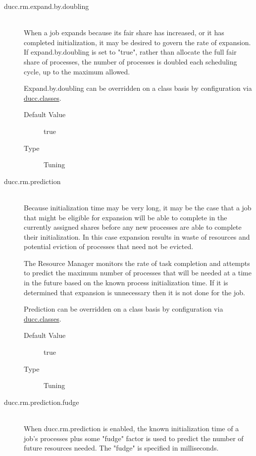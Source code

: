 \begin{description}
        \item[ducc.rm.expand.by.doubling] \hfill \\
          When a job expands because its fair share has increased, or it has completed initialization, 
          it may be desired to govern the rate of expansion. If expand.by.doubling is set to "true", 
          rather than allocate the full fair share of processes, the number of processes is doubled 
          each scheduling cycle, up to the maximum allowed. 

          Expand.by.doubling can be overridden on a class basis by configuration via 
          \hyperref[sec:ducc.classes]{ducc.classes}.

          \begin{description}
            \item[Default Value] true 
            \item[Type] Tuning 
          \end{description}
          

        \item[ducc.rm.prediction] \hfill \\
          Because initialization time may be very long, it may be the case that a job that might be 
          eligible for expansion will be able to complete in the currently assigned shares before any 
          new processes are able to complete their initialization. In this case expansion results in 
          waste of resources and potential eviction of processes that need not be evicted. 
          
          The Resource Manager monitors the rate of task completion and attempts to predict the 
          maximum number of processes that will be needed at a time in the future based on the 
          known process initialization time. If it is determined that expansion is unnecessary then it 
          is not done for the job. 
          
          Prediction can be overridden on a class basis by configuration via
          \hyperref[sec:ducc.classes]{ducc.classes}.
          \begin{description}
            \item[Default Value] true 
            \item[Type] Tuning 
          \end{description}
          

        \item[ducc.rm.prediction.fudge] \hfill \\
          When ducc.rm.prediction is enabled, the known initialization time of a job's processes plus 
          some "fudge" factor is used to predict the number of future resources needed. The "fudge" 
          is specified in milliseconds. 
          

\end{description}
